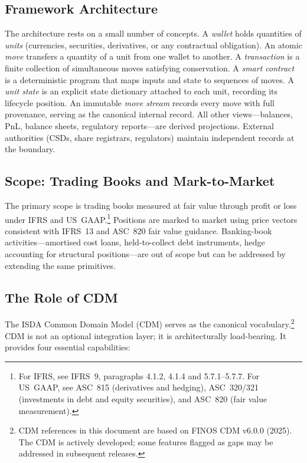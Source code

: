 \documentclass[11pt,a4paper]{article}
\begin{document}
\subsection{Framework Architecture}

The architecture rests on a small number of concepts. A \textit{wallet} holds quantities of \textit{units} (currencies, securities, derivatives, or any contractual obligation). An atomic \textit{move} transfers a quantity of a unit from one wallet to another. A \textit{transaction} is a finite collection of simultaneous moves satisfying conservation. A \textit{smart contract} is a deterministic program that maps inputs and state to sequences of moves. A \textit{unit state} is an explicit state dictionary attached to each unit, recording its lifecycle position. An immutable \textit{move stream} records every move with full provenance, serving as the canonical internal record. All other views---balances, PnL, balance sheets, regulatory reports---are derived projections. External authorities (CSDs, share registrars, regulators) maintain independent records at the boundary.

\subsection{Scope: Trading Books and Mark-to-Market}

The primary scope is trading books measured at fair value through profit or loss under IFRS and US~GAAP.\footnote{For IFRS, see IFRS~9, paragraphs 4.1.2, 4.1.4 and 5.7.1--5.7.7. For US~GAAP, see ASC~815 (derivatives and hedging), ASC~320/321 (investments in debt and equity securities), and ASC~820 (fair value measurement).} Positions are marked to market using price vectors consistent with IFRS~13 and ASC~820 fair value guidance. Banking-book activities---amortised cost loans, held-to-collect debt instruments, hedge accounting for structural positions---are out of scope but can be addressed by extending the same primitives.

\subsection{The Role of CDM}

The ISDA Common Domain Model (CDM) serves as the canonical vocabulary.\footnote{CDM references in this document are based on FINOS CDM v6.0.0 (2025). The CDM is actively developed; some features flagged as gaps may be addressed in subsequent releases.} CDM is not an optional integration layer; it is architecturally load-bearing. It provides four essential capabilities:
\end{document}
